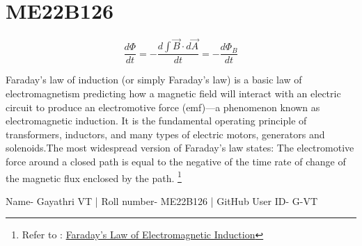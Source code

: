 \section{ME22B126}
\begin{equation}
    \frac{d\Phi}{dt} = -\frac{d\int\vec{B} \cdot d\vec{A}}{dt} = -\frac{d\Phi_B}{dt}
\end{equation}

Faraday's law of induction (or simply Faraday's law) is a basic law of electromagnetism predicting how a magnetic field will interact with an electric circuit to produce an electromotive force (emf)—a phenomenon known as electromagnetic induction. It is the fundamental operating principle of transformers, inductors, and many types of electric motors, generators and solenoids.The most widespread version of Faraday's law states:
The electromotive force around a closed path is equal to the negative of the time rate of change of the magnetic flux enclosed by the path. \footnote{ 
Refer to : \href{https://en.wikipedia.org/wiki/Faraday\%27s_law_of_induction}{Faraday's Law of Electromagnetic Induction}
}

Name- Gayathri VT | Roll number- ME22B126 | GitHub User ID- G-VT



